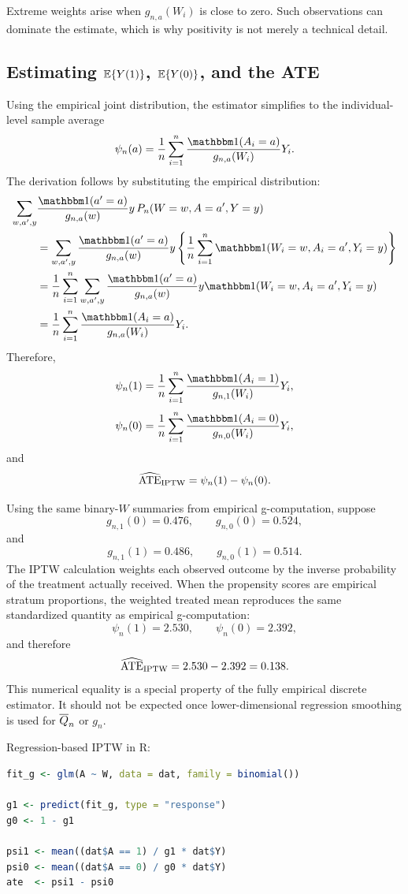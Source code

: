 Extreme weights arise when $g_{n,a}(W_i)$ is close to zero. Such observations can
dominate the estimate, which is why positivity is not merely a technical detail.

\subsection{Estimating $\mathbb{E}\{Y(1)\}$, $\mathbb{E}\{Y(0)\}$, and the ATE}

Using the empirical joint distribution, the estimator simplifies to the individual-level
sample average
\[
\psi_n(a)
=
\frac{1}{n}\sum_{i=1}^n
\frac{\ind(A_i=a)}{g_{n,a}(W_i)}Y_i.
\]
The derivation follows by substituting the empirical distribution:
\[
\begin{aligned}
\sum_{w,a',y}
&\frac{\ind(a'=a)}{g_{n,a}(w)}
y\,P_n(W=w,A=a',Y=y)\\
&=
\sum_{w,a',y}
\frac{\ind(a'=a)}{g_{n,a}(w)}
y\left\{
\frac{1}{n}\sum_{i=1}^n
\ind(W_i=w,A_i=a',Y_i=y)
\right\}\\
&=
\frac{1}{n}\sum_{i=1}^n
\sum_{w,a',y}
\frac{\ind(a'=a)}{g_{n,a}(w)}
y\ind(W_i=w,A_i=a',Y_i=y)\\
&=
\frac{1}{n}\sum_{i=1}^n
\frac{\ind(A_i=a)}{g_{n,a}(W_i)}Y_i.
\end{aligned}
\]
Therefore,
\[
\psi_n(1)
=
\frac{1}{n}\sum_{i=1}^n
\frac{\ind(A_i=1)}{g_{n,1}(W_i)}Y_i,
\]
\[
\psi_n(0)
=
\frac{1}{n}\sum_{i=1}^n
\frac{\ind(A_i=0)}{g_{n,0}(W_i)}Y_i,
\]
and
\[
\widehat{\operatorname{ATE}}_{\operatorname{IPTW}}=\psi_n(1)-\psi_n(0).
\]

Using the same binary-$W$ summaries from empirical g-computation, suppose
\[
g_{n,1}(0)=0.476,\qquad g_{n,0}(0)=0.524,
\]
and
\[
g_{n,1}(1)=0.486,\qquad g_{n,0}(1)=0.514.
\]
The IPTW calculation weights each observed outcome by the inverse probability of
the treatment actually received. When the propensity scores are empirical stratum
proportions, the weighted treated mean reproduces the same standardized quantity
as empirical g-computation:
\[
\psi_n(1)=2.530,\qquad \psi_n(0)=2.392,
\]
and therefore
\[
\widehat{\operatorname{ATE}}_{\operatorname{IPTW}}=2.530-2.392=0.138.
\]
This numerical equality is a special property of the fully empirical discrete
estimator. It should not be expected once lower-dimensional regression smoothing is
used for $\overline{Q}_n$ or $g_n$.

\begin{implementationbox}
Regression-based IPTW in R:
\begin{lstlisting}[language=R]
fit_g <- glm(A ~ W, data = dat, family = binomial())

g1 <- predict(fit_g, type = "response")
g0 <- 1 - g1

psi1 <- mean((dat$A == 1) / g1 * dat$Y)
psi0 <- mean((dat$A == 0) / g0 * dat$Y)
ate  <- psi1 - psi0
\end{lstlisting}
\end{implementationbox}

